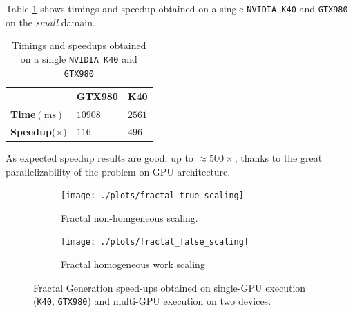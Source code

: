 Table \ref{tab:julia_single_GPU} shows timings and speedup obtained on a single \texttt{NVIDIA K40} and \texttt{GTX980} on the \textit{small} damain.
\begin{table}
	\centering
	\caption{Timings and speedups obtained on a single \texttt{NVIDIA K40} and \texttt{GTX980}}
	\label{tab:julia_single_GPU}
\begin{tabular}{@{}lll@{}}
	\toprule
	& GTX980 & K40 \\ \midrule
	\textbf{Time}$(\si{\milli\second})$    & $10908$      & $2561$   \\
	\textbf{Speedup}($\times$) & $116$      & $496$  \\
	\bottomrule
\end{tabular}
\end{table}
As expected speedup results are good, up to $\approx 500 \times$, thanks to the great parallelizability of the problem on GPU architecture.
\begin{figure}
	
	\begin{subfigure}{1.0\textwidth}
		\caption{Fractal non-homgeneous scaling.}
		\label{fig:fractal_true_scaling}
		\texttt{[image: ./plots/fractal\_true\_scaling]}
	\end{subfigure}		
	\endminipage
	
	\begin{subfigure}{1.0\textwidth}
		\caption{Fractal homogeneous work scaling}
		\label{fig:fractal_false_scaling}
		\texttt{[image: ./plots/fractal\_false\_scaling]}
	\end{subfigure}
	\endminipage\hfill
	\caption[]{Fractal Generation speed-ups obtained on single-GPU execution (\texttt{K40}, \texttt{GTX980}) and multi-GPU execution on two devices.
	 }
	\label{fig:fractal_scaling}
\end{figure}

